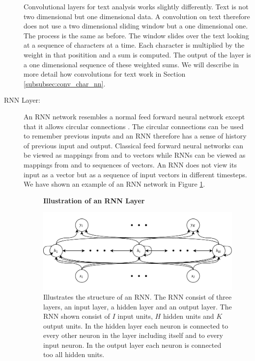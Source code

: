 \begin{description}
        Convolutional layers for text analysis works slightly differently.
        Text is not two dimensional but one dimensional data. A convolution
        on text therefore does not use a two dimensional sliding window but
        a one dimensional one. The process is the same as before. The window
        slides over the text looking at a sequence of characters at a time. Each
        character is multiplied by the weight in that positition and a sum is
        computed. The output of the layer is a one dimensional sequence of these
        weighted sums. We will describe in more detail how convolutions for text
        work in Section \ref{subsubsec:conv_char_nn}.

    \item[\gls{RNN} Layer:]

        An \gls{RNN} network resembles a normal feed forward
        neural network except that it allows circular connections
        \citep{DBLP:series/sci/2012-385}. The circular connections can be used
        to remember previous inputs and an \gls{RNN} therefore has a sense of
        history of previous input and output. Classical feed forward neural
        networks can be viewed as mappings from and to vectors while \glspl{RNN}
        can be viewed as mappings from and to sequences of vectors. An \gls{RNN}
        does not view its input as a vector but as a sequence of input vectors
        in different timesteps. We have shown an example of an \gls{RNN} network
        in Figure \ref{fig:rnn_illustration}.

        \begin{figure}
            \centering
            \textbf{Illustration of an \gls{RNN} Layer}\par\medskip
            \includegraphics[width=\textwidth]{./pictures/method/RNN}
            \caption{Illustrates the structure of an \gls{RNN}. The \gls{RNN}
                consist of three layers, an input layer, a hidden layer and an
                output layer. The \gls{RNN} shown consist of $I$ input units,
                $H$ hidden units and $K$ output units. In the hidden layer each
                neuron is connected to every other neuron in the layer including
                itself and to every input neuron. In the output layer each
                neuron is connected too all hidden units.}
            \label{fig:rnn_illustration}
        \end{figure}


\end{description}
